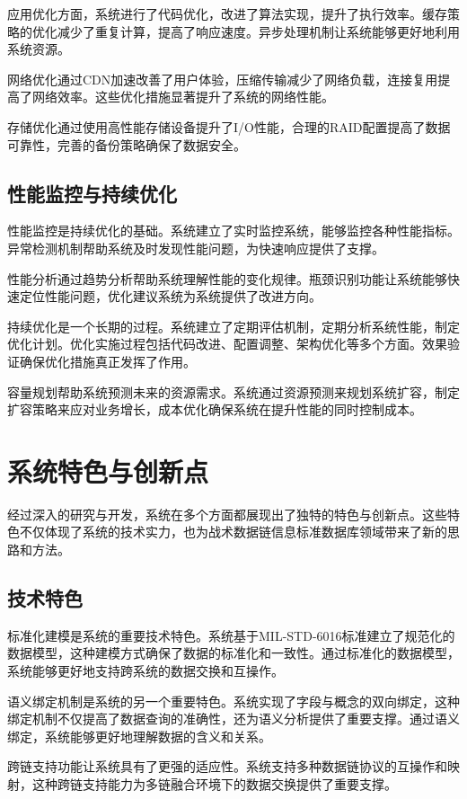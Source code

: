 应用优化方面，系统进行了代码优化，改进了算法实现，提升了执行效率。缓存策略的优化减少了重复计算，提高了响应速度。异步处理机制让系统能够更好地利用系统资源。

网络优化通过CDN加速改善了用户体验，压缩传输减少了网络负载，连接复用提高了网络效率。这些优化措施显著提升了系统的网络性能。

存储优化通过使用高性能存储设备提升了I/O性能，合理的RAID配置提高了数据可靠性，完善的备份策略确保了数据安全。

\subsection{性能监控与持续优化}

性能监控是持续优化的基础。系统建立了实时监控系统，能够监控各种性能指标。异常检测机制帮助系统及时发现性能问题，为快速响应提供了支撑。

性能分析通过趋势分析帮助系统理解性能的变化规律。瓶颈识别功能让系统能够快速定位性能问题，优化建议系统为系统提供了改进方向。

持续优化是一个长期的过程。系统建立了定期评估机制，定期分析系统性能，制定优化计划。优化实施过程包括代码改进、配置调整、架构优化等多个方面。效果验证确保优化措施真正发挥了作用。

容量规划帮助系统预测未来的资源需求。系统通过资源预测来规划系统扩容，制定扩容策略来应对业务增长，成本优化确保系统在提升性能的同时控制成本。

\section{系统特色与创新点}

经过深入的研究与开发，系统在多个方面都展现出了独特的特色与创新点。这些特色不仅体现了系统的技术实力，也为战术数据链信息标准数据库领域带来了新的思路和方法。

\subsection{技术特色}

标准化建模是系统的重要技术特色。系统基于MIL-STD-6016标准建立了规范化的数据模型，这种建模方式确保了数据的标准化和一致性。通过标准化的数据模型，系统能够更好地支持跨系统的数据交换和互操作。

语义绑定机制是系统的另一个重要特色。系统实现了字段与概念的双向绑定，这种绑定机制不仅提高了数据查询的准确性，还为语义分析提供了重要支撑。通过语义绑定，系统能够更好地理解数据的含义和关系。

跨链支持功能让系统具有了更强的适应性。系统支持多种数据链协议的互操作和映射，这种跨链支持能力为多链融合环境下的数据交换提供了重要支撑。


